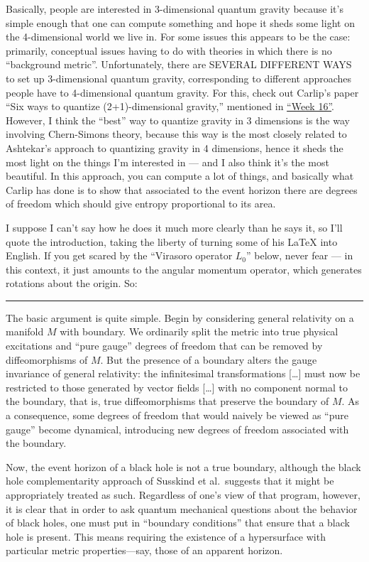 \documentclass{article}
\begin{document}
Basically, people are interested in 3-dimensional quantum gravity
because it's simple enough that one can compute something and hope it
sheds some light on the 4-dimensional world we live in. For some issues
this appears to be the case: primarily, conceptual issues having to do
with theories in which there is no ``background metric''. Unfortunately,
there are SEVERAL DIFFERENT WAYS to set up 3-dimensional quantum
gravity, corresponding to different approaches people have to
4-dimensional quantum gravity. For this, check out Carlip's paper ``Six
ways to quantize (2+1)-dimensional gravity,'' mentioned in
\protect\hyperlink{week16}{``Week 16''}. However, I think the ``best''
way to quantize gravity in 3 dimensions is the way involving
Chern-Simons theory, because this way is the most closely related to
Ashtekar's approach to quantizing gravity in 4 dimensions, hence it
sheds the most light on the things I'm interested in --- and I also
think it's the most beautiful. In this approach, you can compute a lot
of things, and basically what Carlip has done is to show that associated
to the event horizon there are degrees of freedom which should give
entropy proportional to its area.

I suppose I can't say how he does it much more clearly than he says it,
so I'll quote the introduction, taking the liberty of turning some of
his LaTeX into English. If you get scared by the ``Virasoro operator
\(L_0\)'' below, never fear --- in this context, it just amounts to the
angular momentum operator, which generates rotations about the origin.
So:

\begin{center}\rule{0.5\linewidth}{0.5pt}\end{center}

The basic argument is quite simple. Begin by considering general
relativity on a manifold \(M\) with boundary. We ordinarily split the
metric into true physical excitations and ``pure gauge'' degrees of
freedom that can be removed by diffeomorphisms of \(M\). But the
presence of a boundary alters the gauge invariance of general
relativity: the infinitesimal transformations {[}\ldots{]} must now be
restricted to those generated by vector fields {[}\ldots{]} with no
component normal to the boundary, that is, true diffeomorphisms that
preserve the boundary of \(M\). As a consequence, some degrees of
freedom that would naively be viewed as ``pure gauge'' become dynamical,
introducing new degrees of freedom associated with the boundary.

Now, the event horizon of a black hole is not a true boundary, although
the black hole complementarity approach of Susskind et al.~suggests that
it might be appropriately treated as such. Regardless of one's view of
that program, however, it is clear that in order to ask quantum
mechanical questions about the behavior of black holes, one must put in
``boundary conditions'' that ensure that a black hole is present. This
means requiring the existence of a hypersurface with particular metric
properties---say, those of an apparent horizon.
\end{document}
